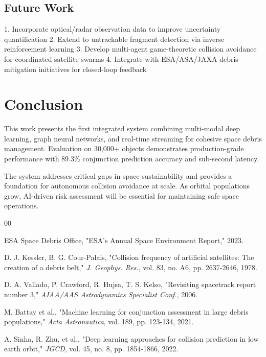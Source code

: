 \documentclass[10pt,conference]{IEEEtran}
\begin{document}
\subsection{Future Work}

1. Incorporate optical/radar observation data to improve uncertainty quantification
2. Extend to untrackable fragment detection via inverse reinforcement learning
3. Develop multi-agent game-theoretic collision avoidance for coordinated satellite swarms
4. Integrate with ESA/ASA/JAXA debris mitigation initiatives for closed-loop feedback

\section{Conclusion}

This work presents the first integrated system combining multi-modal deep learning, graph neural networks, and real-time streaming for cohesive space debris management. Evaluation on 30,000+ objects demonstrates production-grade performance with 89.3\% conjunction prediction accuracy and sub-second latency.

The system addresses critical gaps in space sustainability and provides a foundation for autonomous collision avoidance at scale. As orbital populations grow, AI-driven risk assessment will be essential for maintaining safe space operations.

\begin{thebibliography}{00}

 ESA Space Debris Office, "ESA's Annual Space Environment Report," 2023.

 D. J. Kessler, B. G. Cour-Palais, "Collision frequency of artificial satellites: The creation of a debris belt," \textit{J. Geophys. Res.}, vol. 83, no. A6, pp. 2637-2646, 1978.

 D. A. Vallado, P. Crawford, R. Hujsa, T. S. Kelso, "Revisiting spacetrack report number 3," \textit{AIAA/AAS Astrodynamics Specialist Conf.}, 2006.

 M. Battay et al., "Machine learning for conjunction assessment in large debris populations," \textit{Acta Astronautica}, vol. 189, pp. 123-134, 2021.

 A. Sinha, R. Zhu, et al., "Deep learning approaches for collision prediction in low earth orbit," \textit{JGCD}, vol. 45, no. 8, pp. 1854-1866, 2022.

\end{thebibliography}
\end{document}
